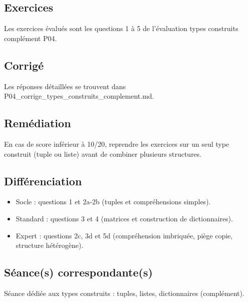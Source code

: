 \subsection{Exercices}

Les exercices évalués sont les questions 1 à 5 de l'évaluation types
construits complément P04.

\subsection{Corrigé}

Les réponses détaillées se trouvent dans
P04\_corrige\_types\_construits\_complement.md.

\subsection{Remédiation}

En cas de score inférieur à 10/20, reprendre les exercices sur un seul
type construit (tuple ou liste) avant de combiner plusieurs structures.

\subsection{Différenciation}

\begin{itemize}
\tightlist
\item
  Socle : questions 1 et 2a-2b (tuples et compréhensions simples).
\item
  Standard : questions 3 et 4 (matrices et construction de
  dictionnaires).
\item
  Expert : questions 2c, 3d et 5d (compréhension imbriquée, piège copie,
  structure hétérogène).
\end{itemize}

\subsection{Séance(s) correspondante(s)}

Séance dédiée aux types construits : tuples, listes, dictionnaires
(complément).

